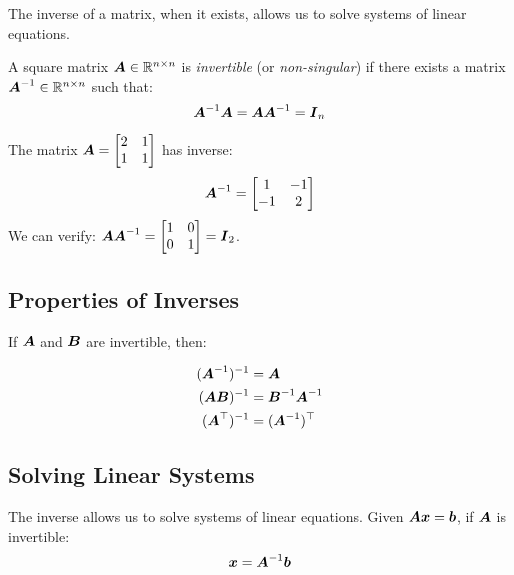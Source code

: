 The inverse of a matrix, when it exists, allows us to solve systems of linear equations.

\begin{definition}
A square matrix $\boldsymbol{A} \in \mathbb{R}^{n \times n}$ is \emph{invertible} (or \emph{non-singular}) if there exists a matrix $\boldsymbol{A}^{-1} \in \mathbb{R}^{n \times n}$ such that:
\begin{equation}
    \boldsymbol{A}^{-1}\boldsymbol{A} = \boldsymbol{A}\boldsymbol{A}^{-1} = \boldsymbol{I}_n
\end{equation}
\end{definition}

\begin{example}
The matrix $\boldsymbol{A} = \begin{bmatrix} 2 & 1 \\ 1 & 1 \end{bmatrix}$ has inverse:
\begin{equation}
    \boldsymbol{A}^{-1} = \begin{bmatrix} 1 & -1 \\ -1 & 2 \end{bmatrix}
\end{equation}
We can verify: $\boldsymbol{A}\boldsymbol{A}^{-1} = \begin{bmatrix} 1 & 0 \\ 0 & 1 \end{bmatrix} = \boldsymbol{I}_2$.
\end{example}

\subsection{Properties of Inverses}

If $\boldsymbol{A}$ and $\boldsymbol{B}$ are invertible, then:

\begin{align}
    (\boldsymbol{A}^{-1})^{-1} &= \boldsymbol{A} \\
    (\boldsymbol{AB})^{-1} &= \boldsymbol{B}^{-1}\boldsymbol{A}^{-1} \\
    (\boldsymbol{A}^\top)^{-1} &= (\boldsymbol{A}^{-1})^\top
\end{align}

\subsection{Solving Linear Systems}

The inverse allows us to solve systems of linear equations. Given $\boldsymbol{A}\boldsymbol{x} = \boldsymbol{b}$, if $\boldsymbol{A}$ is invertible:
\begin{equation}
    \boldsymbol{x} = \boldsymbol{A}^{-1}\boldsymbol{b}
\end{equation}

